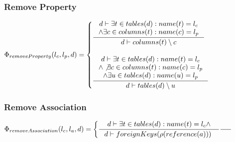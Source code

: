 \documentclass[11pt]{article}
\begin{document}
\subsubsection{Remove Property}
$
\Phi_{removeProperty}(l_c, l_p, d) = \begin{cases}
 \inference{d \vdash \exists t \in tables(d) : name(t) = l_c \\ \wedge \exists c \in columns(t) : name(c) = l_p  }{d \vdash
columns(t) \setminus c
} \\ \\
  \inference{d \vdash \exists t \in tables(d) : name(t) = l_c \\ \wedge \not \exists c \in columns(t) : name(c) = l_p \\ \wedge \exists u \in tables(d) : name(u) = l_p }{d \vdash tables(d) \setminus u }
 \end{cases}
$

\subsubsection{Remove Association}
$
\Phi_{removeAssociation}(l_c, l_a, d) = \begin{cases}
 \inference{d \vdash \exists t \in tables(d) : name(t) = l_c \wedge }{d \vdash foreignKeys(\rho(reference(a))) \ }
 
 \inference{}{}
 \end{cases}
$
	
\end{document}
